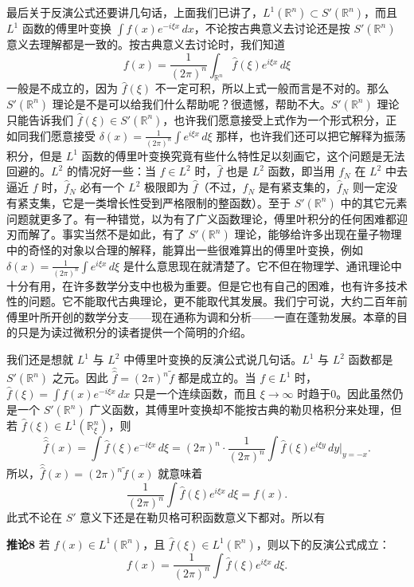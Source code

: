 最后关于反演公式还要讲几句话，上面我们已讲了，$L^1(\mathbb R^n)\subset S'(\mathbb R^n)$，而且 $L^1$ 函数的傅里叶变换 $\int f(x)e^{-i\xi x}\,dx$，不论按古典意义去讨论还是按 $S'(\mathbb R^n)$ 意义去理解都是一致的。按古典意义去讨论时，我们知道
\[
 f(x)=\frac1{(2\pi)^n}\int_{\mathbb R^n}\widehat f(\xi)e^{i\xi x}\,d\xi
\]
一般是不成立的，因为 $\widehat f(\xi)$ 不一定可积，所以上式一般而言是不对的。那么 $S'(\mathbb R^n)$ 理论是不是可以给我们什么帮助呢？很遗憾，帮助不大。$S'(\mathbb R^n)$ 理论只能告诉我们 $\widehat f(\xi)\in S'(\mathbb R^n)$，也许我们愿意接受上式作为一个形式积分，正如同我们愿意接受 $\delta(x)=\frac1{(2\pi)^n}\int e^{i\xi x}\,d\xi$ 那样，也许我们还可以把它解释为振荡积分，但是 $L^1$ 函数的傅里叶变换究竟有些什么特性足以刻画它，这个问题是无法回避的。$L^2$ 的情况好一些：当 $f\in L^2$ 时，$\widehat f$ 也是 $L^2$ 函数，即当用 $f_N$ 在 $L^2$ 中去逼近 $f$ 时，$\widehat f_N$ 必有一个 $L^2$ 极限即为 $\widehat f$（不过，$f_N$ 是有紧支集的，$\widehat f_N$ 则一定没有紧支集，它是一类增长性受到严格限制的整函数）。至于 $S'(\mathbb R^n)$ 中的其它元素问题就更多了。有一种错觉，以为有了广义函数理论，傅里叶积分的任何困难都迎刃而解了。事实当然不是如此，有了 $S'(\mathbb R^n)$ 理论，能够给许多出现在量子物理中的奇怪的对象以合理的解释，能算出一些很难算出的傅里叶变换，例如 $\delta(x)=\frac1{(2\pi)^n}\int e^{i\xi x}\,d\xi$ 是什么意思现在就清楚了。它不但在物理学、通讯理论中十分有用，在许多数学分支中也极为重要。但是它也有自己的困难，也有许多技术性的问题。它不能取代古典理论，更不能取代其发展。我们宁可说，大约二百年前傅里叶所开创的数学分支——现在通称为调和分析——一直在蓬勃发展。本章的目的只是为读过微积分的读者提供一个简明的介绍。

我们还是想就 $L^1$ 与 $L^2$ 中傅里叶变换的反演公式说几句话。$L^1$ 与 $L^2$ 函数都是 $S'(\mathbb R^n)$ 之元。因此 $\widehat{\widehat f}=(2\pi)^n\widetilde f$ 都是成立的。当 $f\in L^1$ 时，$\widehat f(\xi)=\int f(x)e^{-i\xi x}\,dx$ 只是一个连续函数，而且 $\xi\to\infty$ 时趋于0。因此虽然仍是一个 $S'(\mathbb R^n)$ 广义函数，其傅里叶变换却不能按古典的勒贝格积分来处理，但若 $\widehat f(\xi)\in L^1(\mathbb R^n_\xi)$，则
\[
 \widehat{\widehat f}(x)=\int\widehat f(\xi)e^{-i\xi x}\,d\xi
 =(2\pi)^n\cdot\frac1{(2\pi)^n}\int\widehat f(\xi)e^{i\xi y}\,dy\Big|_{y=-x}.
\]
所以，$\widehat{\widehat f}(x)=(2\pi)^n\widetilde f(x)$ 就意味着
\[
 \frac1{(2\pi)^n}\int\widehat f(\xi)e^{i\xi x}\,d\xi=f(x).
\]
此式不论在 $S'$ 意义下还是在勒贝格可积函数意义下都对。所以有

\noindent\textbf{推论8}\quad
若 $f(x)\in L^1(\mathbb R^n)$，且 $\widehat f(\xi)\in L^1(\mathbb R^n)$，则以下的反演公式成立：
\[
 f(x)=\frac1{(2\pi)^n}\int\widehat f(\xi)e^{i\xi x}\,d\xi.
\]

